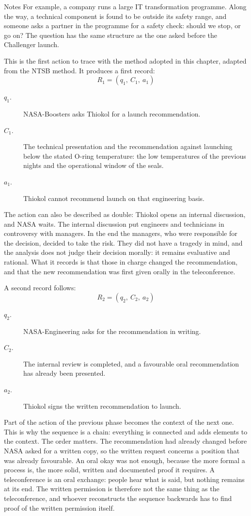 \begin{nota}{Notes}
	For example, a company runs a large IT transformation programme. Along the way, a technical component is found to be outside its safety range, and someone asks a partner in the programme for a safety check: should we stop, or go on? The question has the same structure as the one asked before the Challenger launch.
\end{nota}

This is the first action to trace with the method adopted in this chapter, adapted from the NTSB method. It produces a first record:
\[
R_1 = (q_1,\ C_1,\ a_1)
\]
\begin{description}
	\item[$q_1$.] NASA-Boosters asks Thiokol for a launch recommendation.
	\item[$C_1$.] The technical presentation and the recommendation against launching below the stated O-ring temperature: the low temperatures of the previous nights and the operational window of the seals.
	\item[$a_1$.] Thiokol cannot recommend launch on that engineering basis.
\end{description}

The action can also be described as double: Thiokol opens an internal discussion, and NASA waits. The internal discussion put engineers and technicians in controversy with managers. In the end the managers, who were responsible for the decision, decided to take the risk. They did not have a tragedy in mind, and the analysis does not judge their decision morally: it remains evaluative and rational. What it records is that those in charge changed the recommendation, and that the new recommendation was first given orally in the teleconference.

A second record follows:
\[
R_2 = (q_2,\ C_2,\ a_2)
\]
\begin{description}
	\item[$q_2$.] NASA-Engineering asks for the recommendation in writing.
	\item[$C_2$.] The internal review is completed, and a favourable oral recommendation has already been presented.
	\item[$a_2$.] Thiokol signs the written recommendation to launch.
\end{description}

Part of the action of the previous phase becomes the context of the next one. This is why the sequence is a chain: everything is connected and adds elements to the context. The order matters. The recommendation had already changed before NASA asked for a written copy, so the written request concerns a position that was already favourable. An oral okay was not enough, because the more formal a process is, the more solid, written and documented proof it requires. A teleconference is an oral exchange: people hear what is said, but nothing remains at its end. The written permission is therefore not the same thing as the teleconference, and whoever reconstructs the sequence backwards has to find proof of the written permission itself.

